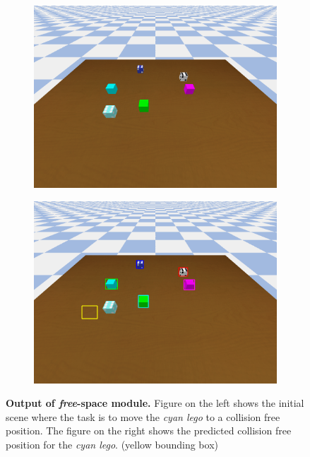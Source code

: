 \begin{figure}[h!]
    \begin{subfigure}{0.5\hsize}
         \centering    
         \includegraphics[scale=0.19]{figures/rze_i.png}
    \end{subfigure}
    \begin{subfigure}{0.5\hsize}
         \centering    
         \includegraphics[scale=0.19]{figures/rze_pre.png}
    \end{subfigure}
    \caption{
        \footnotesize{
            \textbf{Output of \textit{free}-space module.} Figure on the left shows the initial scene where the task is to move the \textit{cyan lego} to a collision free position. The figure on the right shows the predicted collision free position for the \textit{cyan lego}. (yellow bounding box)
        }
    }
    \vspace{-0.15in}
    \label{fig:sgp}
\end{figure}

